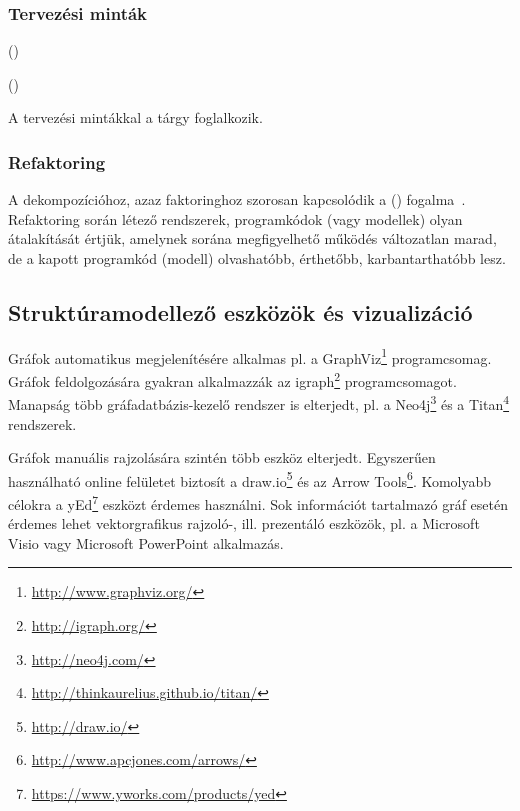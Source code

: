 \subsubsection{Tervezési minták}


 () 

 ()



A tervezési mintákkal a \sznikak tárgy foglalkozik.

\subsubsection{Refaktoring}

A dekompozícióhoz, azaz faktoringhoz szorosan kapcsolódik a  () fogalma~\cite{fowler2012refactoring}. Refaktoring során létező rendszerek, programkódok (vagy modellek) olyan átalakítását értjük, amelynek sorána megfigyelhető működés változatlan marad, de a kapott programkód (modell) olvashatóbb, érthetőbb, karbantarthatóbb lesz.

\subsection{Struktúramodellező eszközök és vizualizáció}

Gráfok automatikus megjelenítésére alkalmas pl. a GraphViz\footnote{\url{http://www.graphviz.org/}} programcsomag. Gráfok feldolgozására gyakran alkalmazzák az igraph\footnote{\url{http://igraph.org/}} programcsomagot. Manapság több gráfadatbázis-kezelő rendszer is elterjedt, pl. a Neo4j\footnote{\url{http://neo4j.com/}} és a Titan\footnote{\url{http://thinkaurelius.github.io/titan/}} rendszerek.

Gráfok manuális rajzolására szintén több eszköz elterjedt. Egyszerűen használható online felületet biztosít a draw.io\footnote{\url{http://draw.io/}} és az Arrow Tools\footnote{\url{http://www.apcjones.com/arrows/}}. Komolyabb célokra a yEd\footnote{\url{https://www.yworks.com/products/yed}} eszközt érdemes használni. Sok információt tartalmazó gráf esetén érdemes lehet vektorgrafikus rajzoló-, ill. prezentáló eszközök, pl. a Microsoft Visio vagy Microsoft PowerPoint alkalmazás.

